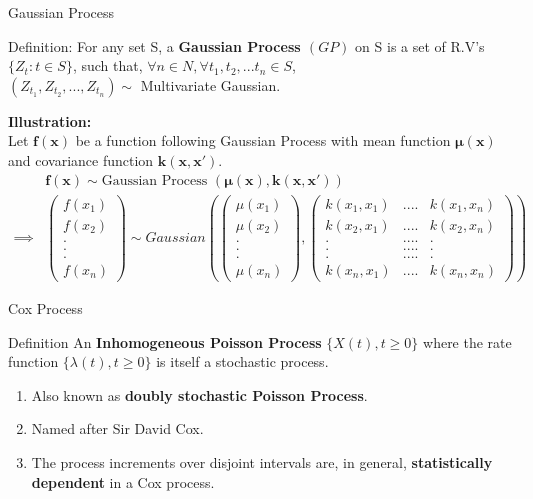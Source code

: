 \documentclass{beamer}
\providecommand{\brak}[1]{\ensuremath{\left(#1\right)}}
\let\vec\mathbf
\newcommand{\myvec}[1]{\ensuremath{\begin{pmatrix}#1\end{pmatrix}}}
\begin{document}
\begin{frame}{Gaussian Process}
\begin{block}{Definition:}
    For any set S, a \textbf{Gaussian Process \brak{GP}} on S is a set of R.V's $\{Z_t: t\in S\}$, such that, $\forall n\in N, \forall t_1,t_2,...t_n \in S$,\\
    $\brak{Z_{t_{1}}, Z_{t_{2}},...,Z_{t_{n}}} \sim$ Multivariate Gaussian.
\end{block}
\textbf{Illustration:}\\
Let $\vec{f\brak x}$ be a function following Gaussian Process with mean function $\vec{\mu \brak {x}}$ and covariance function $\vec{k\brak{x, x'}}$.
\begin{align}
    &\vec{f\brak x} \sim \text{Gaussian Process } \brak{\vec{\mu \brak x},\vec{ k\brak{x,x'}}}\\
    \implies &\myvec{f\brak{x_1}\\f\brak{x_2}\\.\\.\\.\\f\brak{x_n}} \sim Gaussian \brak{\myvec{\mu\brak{x_1}\\ \mu\brak{x_2}\\ .\\.\\.\\ \mu\brak{x_n}}, \myvec{k\brak{x_1,x_1} &....& k\brak{x_1,x_n}\\ k\brak{x_2,x_1} &....& k\brak{x_2,x_n}\\. &....&.\\.&....&.\\.&....&.\\ k\brak{x_n,x_1} &....& k\brak{x_n,x_n}}}
\end{align}
\end{frame}

\begin{frame}{Cox Process}
\begin{block}{Definition}
    An \textbf{Inhomogeneous Poisson Process} $\{X\brak t, t \ge 0\}$ where the rate function $\{\lambda\brak t , t\ge 0 \}$ is itself a stochastic process.
\end{block}
\begin{enumerate}
    \item Also known as \textbf{doubly stochastic Poisson Process}.
    \item Named after Sir David Cox.
    \item The process increments over disjoint intervals are, in general, \textbf{statistically dependent} in a Cox process.
\end{enumerate}
\end{frame}
\end{document}

